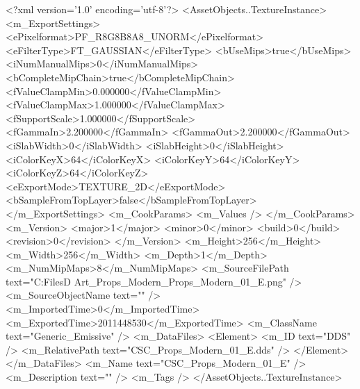 <?xml version='1.0' encoding='utf-8'?>
<AssetObjects..TextureInstance>
  <m_ExportSettings>
    <ePixelformat>PF_R8G8B8A8_UNORM</ePixelformat>
    <eFilterType>FT_GAUSSIAN</eFilterType>
    <bUseMips>true</bUseMips>
    <iNumManualMips>0</iNumManualMips>
    <bCompleteMipChain>true</bCompleteMipChain>
    <fValueClampMin>0.000000</fValueClampMin>
    <fValueClampMax>1.000000</fValueClampMax>
    <fSupportScale>1.000000</fSupportScale>
    <fGammaIn>2.200000</fGammaIn>
    <fGammaOut>2.200000</fGammaOut>
    <iSlabWidth>0</iSlabWidth>
    <iSlabHeight>0</iSlabHeight>
    <iColorKeyX>64</iColorKeyX>
    <iColorKeyY>64</iColorKeyY>
    <iColorKeyZ>64</iColorKeyZ>
    <eExportMode>TEXTURE_2D</eExportMode>
    <bSampleFromTopLayer>false</bSampleFromTopLayer>
  </m_ExportSettings>
  <m_CookParams>
    <m_Values />
  </m_CookParams>
  <m_Version>
    <major>1</major>
    <minor>0</minor>
    <build>0</build>
    <revision>0</revision>
  </m_Version>
  <m_Height>256</m_Height>
  <m_Width>256</m_Width>
  <m_Depth>1</m_Depth>
  <m_NumMipMaps>8</m_NumMipMaps>
  <m_SourceFilePath text="C:\Users\Shadow\Desktop\Working Files\3D Art\Textures\CSC_Props_Modern\Current\textures\CSC_Props_Modern_01_E.png" />
  <m_SourceObjectName text="" />
  <m_ImportedTime>0</m_ImportedTime>
  <m_ExportedTime>2011448530</m_ExportedTime>
  <m_ClassName text="Generic_Emissive" />
  <m_DataFiles>
    <Element>
      <m_ID text="DDS" />
      <m_RelativePath text="CSC_Props_Modern_01_E.dds" />
    </Element>
  </m_DataFiles>
  <m_Name text="CSC_Props_Modern_01_E" />
  <m_Description text="" />
  <m_Tags />
</AssetObjects..TextureInstance>